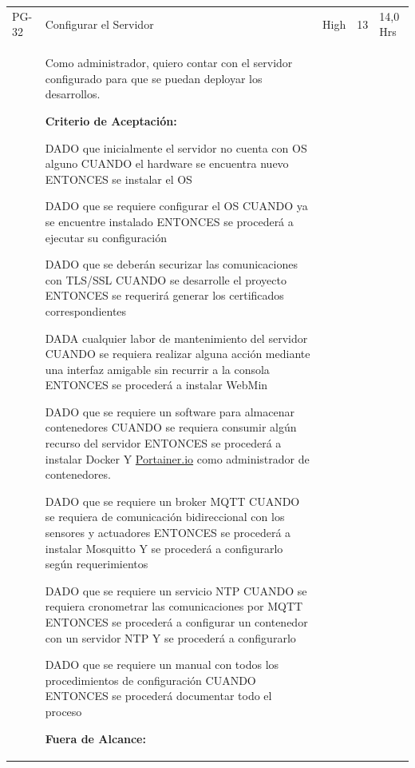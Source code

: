 \documentclass[11pt]{charter}
\begin{document}
\begin{landscape}
\begin{tabularx}{\linewidth}{@{}|p{1.3cm}|p{17cm}|p{1.7cm}|p{1.5cm}|p{1.7cm}|@{}}
PG-32    & Configurar el Servidor         & High               & 13  & 14,0  Hrs         \\
         &  \begin{description}
				   \item Como administrador, quiero   contar con el servidor configurado para que se puedan deployar los   desarrollos.                 
                   \item \textbf{Criterio de Aceptación:}
				   \begin{description} 
					\item DADO que inicialmente el servidor no cuenta con OS alguno CUANDO el hardware se encuentra nuevo ENTONCES se  instalar el OS                 				
					\item DADO que se requiere configurar el OS CUANDO ya se encuentre instalado  ENTONCES se procederá a ejecutar su configuración
					\item DADO que se deberán securizar las comunicaciones con TLS/SSL CUANDO se desarrolle el proyecto ENTONCES se requerirá generar los certificados correspondientes
					\item DADA cualquier labor de mantenimiento del servidor CUANDO se requiera realizar alguna acción mediante una interfaz amigable   sin recurrir a la consola ENTONCES se procederá a instalar WebMin 
					\item DADO que se requiere un software para almacenar contenedores CUANDO se requiera consumir algún recurso del servidor  ENTONCES se procederá a instalar Docker Y \href{http://Portainer.io}{Portainer.io} como administrador de   contenedores.                 
					\item DADO que se requiere un broker MQTT CUANDO se requiera de comunicación bidireccional con los sensores y   actuadores ENTONCES se procederá a instalar Mosquitto Y se procederá a configurarlo según requerimientos                 
					\item DADO que se requiere un servicio NTP CUANDO se requiera cronometrar las comunicaciones por MQTT ENTONCES se procederá a configurar un contenedor con un servidor NTP Y se procederá a configurarlo                 
					\item DADO que se requiere un manual con todos los procedimientos de configuración CUANDO ENTONCES se procederá documentar todo el proceso 
				\end{description}
				\item \textbf{Fuera de Alcance:}	     
					\begin{description} 

\end{description}
\end{description}
\end{tabularx}
\end{landscape}
\end{document}

